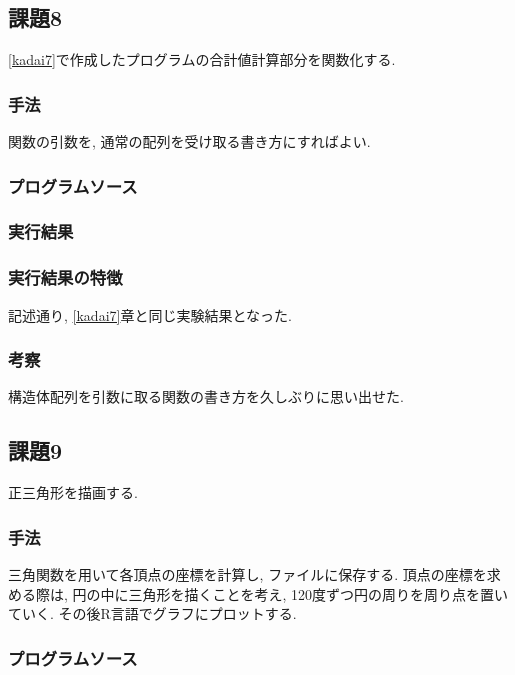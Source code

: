\documentclass{jsarticle}
\begin{document}
            
        \subsection{課題8}
            \ref{kadai7}で作成したプログラムの合計値計算部分を関数化する. 
            \subsubsection{手法}
                関数の引数を, 通常の配列を受け取る書き方にすればよい. 
            \subsubsection{プログラムソース}
                
            \subsubsection{実行結果}
                
            \subsubsection{実行結果の特徴}
                記述通り, \ref{kadai7}章と同じ実験結果となった. 
            \subsubsection{考察}
                構造体配列を引数に取る関数の書き方を久しぶりに思い出せた. 

        \subsection{課題9}
            正三角形を描画する. 
            \subsubsection{手法}
                三角関数を用いて各頂点の座標を計算し, ファイルに保存する. 
                頂点の座標を求める際は, 円の中に三角形を描くことを考え, 120度ずつ円の周りを周り点を置いていく. 
                その後R言語でグラフにプロットする. 
            \subsubsection{プログラムソース}
                
\end{document}
